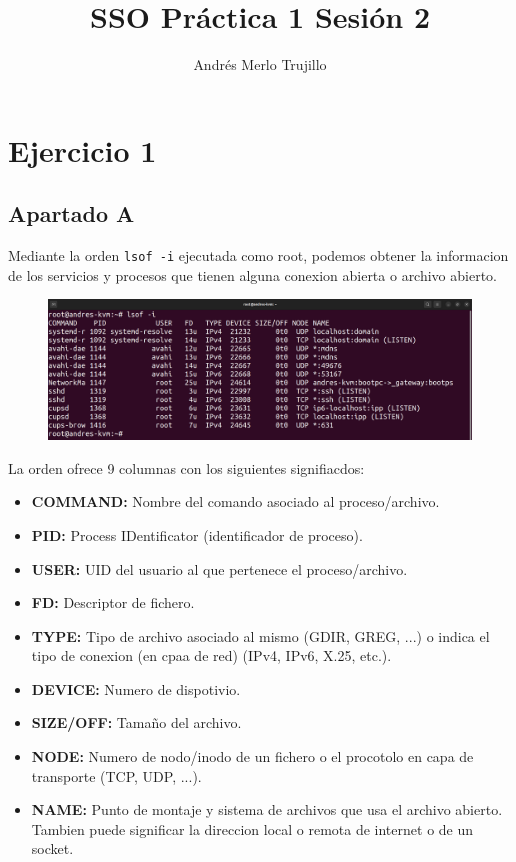 \documentclass{article}
\title{SSO Práctica 1 Sesión 2}
\author{Andrés Merlo Trujillo}
\date{}
\begin{document}
\maketitle

\tableofcontents

\newpage
{}
\section*{Ejercicio 1}

\subsection*{Apartado A}
Mediante la orden \verb|lsof -i| ejecutada como root, podemos obtener la informacion de los servicios y procesos que tienen alguna conexion abierta o archivo abierto.

\begin{figure}[H]
    \includegraphics[width=\textwidth]{imagenes/lsofi.png}
\end{figure}

La orden ofrece 9 columnas con los siguientes signifiacdos:

\begin{itemize}
    \item \textbf{COMMAND: }Nombre del comando asociado al proceso/archivo.
    \item \textbf{PID: }Process IDentificator (identificador de proceso).
    \item \textbf{USER: }UID del usuario al que pertenece el proceso/archivo.
    \item \textbf{FD: }Descriptor de fichero.
    \item \textbf{TYPE: }Tipo de archivo asociado al mismo (GDIR, GREG, ...) o indica el tipo de conexion (en cpaa de red) (IPv4, IPv6, X.25, etc.).
    \item \textbf{DEVICE: }Numero de dispotivio.
    \item \textbf{SIZE/OFF: }Tamaño del archivo.
    \item \textbf{NODE: }Numero de nodo/inodo de un fichero o el procotolo en capa de transporte (TCP, UDP, ...).
    \item \textbf{NAME: }Punto de montaje y sistema de archivos que usa el archivo abierto. Tambien puede significar la direccion local o remota de internet o de un socket.
\end{itemize}
\end{document}
